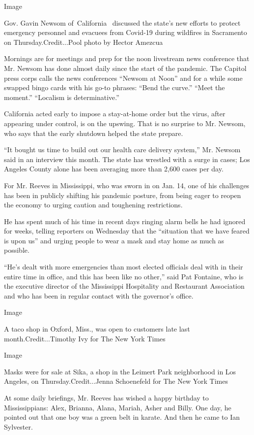 Image

Gov. Gavin Newsom of~California~ discussed the state's new efforts to
protect emergency personnel and evacuees from Covid-19 during wildfires
in Sacramento on Thursday.Credit...Pool photo by Hector Amezcua

Mornings are for meetings and prep for the noon livestream news
conference that Mr. Newsom has done almost daily since the start of the
pandemic. The Capitol press corps calls the news conferences ``Newsom at
Noon'' and for a while some swapped bingo cards with his go-to phrases:
``Bend the curve.'' ``Meet the moment.'' ``Localism is determinative.''

California acted early to impose a stay-at-home order but the virus,
after appearing under control, is on the upswing. That is no surprise to
Mr. Newsom, who says that the early shutdown helped the state prepare.

``It bought us time to build out our health care delivery system,'' Mr.
Newsom said in an interview this month. The state has wrestled with a
surge in cases; Los Angeles County alone has been averaging more than
2,600 cases per day.

For Mr. Reeves in Mississippi, who was sworn in on Jan. 14, one of his
challenges has been in publicly shifting his pandemic posture, from
being eager to reopen the economy to urging caution and toughening
restrictions.

He has spent much of his time in recent days ringing alarm bells he had
ignored for weeks, telling reporters on Wednesday that the ``situation
that we have feared is upon us'' and urging people to wear a mask and
stay home as much as possible.

``He's dealt with more emergencies than most elected officials deal with
in their entire time in office, and this has been like no other,'' said
Pat Fontaine, who is the executive director of the Mississippi
Hospitality and Restaurant Association and who has been in regular
contact with the governor's office.

Image

A taco shop in Oxford, Miss., was open to customers late last
month.Credit...Timothy Ivy for The New York Times

Image

Masks were for sale at Sika, a shop in the Leimert Park neighborhood in
Los Angeles, on Thursday.Credit...Jenna Schoenefeld for The New York
Times

At some daily briefings, Mr. Reeves has wished a happy birthday to
Mississippians: Alex, Brianna, Alana, Mariah, Asher and Billy. One day,
he pointed out that one boy was a green belt in karate. And then he came
to Ian Sylvester.


